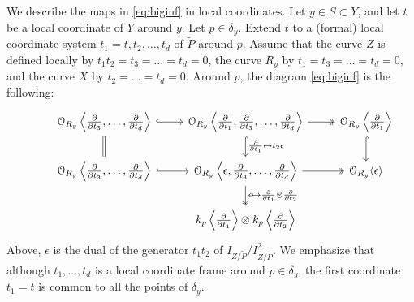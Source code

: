 \documentclass[11 pt]{amsart}
\renewcommand{\k}{k}
\renewcommand{\O}{{\mathcal O}}
\numberwithin{equation}{section}
\begin{document}
We describe the maps in \eqref{eq:biginf} in local coordinates.
Let $y \in S \subset Y$, and let $t$ be a local coordinate of $Y$ around $y$.
Let $p \in \delta_y$.
Extend $t$ to a (formal) local coordinate system $t_1 = t, t_2, \dots, t_d$ of $\widetilde P$ around $p$.
Assume that the curve $Z$ is defined locally by $t_1t_2 = t_3 = \dots = t_d = 0$, the curve $R_y$ by $t_1 = t_3 = \dots = t_d = 0$, and the curve $X$ by $t_2 = \dots = t_d = 0$.
Around $p$, the diagram \eqref{eq:biginf} is the following:
\begin{equation}\label{eq:biginflocal}
  \begin{tikzcd}
    & \O_{R_y}\left\langle\frac{\partial}{\partial t_3}, \dots, \frac{\partial}{\partial t_d}  \right\rangle \arrow[hookrightarrow]{r}\arrow[equal]{d}& \O_{R_y}\left\langle\frac{\partial}{\partial t_1}, \frac{\partial}{\partial t_3}, \dots, \frac{\partial}{\partial t_d} \right\rangle \arrow[two heads]{r}\arrow[hookrightarrow]{d}{\frac{\partial}{\partial t_1} \mapsto t_2 \epsilon}&
    \O_{R_y}\left\langle\frac{\partial}{\partial t_1} \right\rangle\arrow[hookrightarrow]{d}\\
    & \O_{R_y}\left\langle\frac{\partial}{\partial t_3}, \dots, \frac{\partial}{\partial t_d}  \right\rangle  \arrow[hookrightarrow]{r}& 
\O_{R_y}\left\langle \epsilon, \frac{\partial}{\partial t_3}, \dots, \frac{\partial}{\partial t_d} \right\rangle
\arrow[two heads]{r}  \arrow[two heads]{d}{\epsilon \mapsto \frac{\partial}{\partial t_1} \otimes \frac{\partial}{\partial t_2}}  &
\O_{R_y} \langle \epsilon \rangle
\\
&& \k_p \left\langle  \frac{\partial}{\partial t_1} \right\rangle \otimes \k_p \left\langle  \frac{\partial}{\partial t_2} \right\rangle
  \end{tikzcd}
\end{equation}
Above, $\epsilon$ is the dual of the generator $t_1t_2$ of $I_{Z/\widetilde P}/I_{Z/\widetilde P}^2$.
We emphasize that although $t_1, \dots, t_d$ is a local coordinate frame around $p \in \delta_y$, the first coordinate $t_1 = t$ is common to all the points of $\delta_y$.
\end{document}
